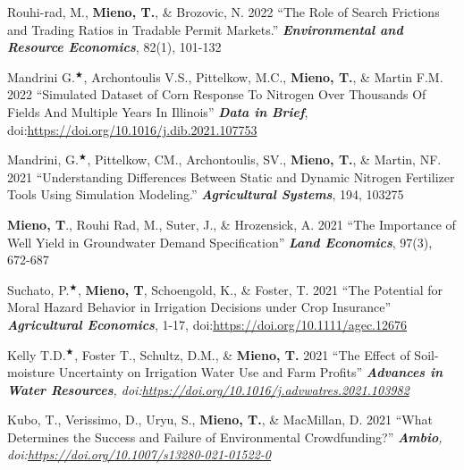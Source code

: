 \documentclass[10pt,margin,line]{res}
\newenvironment{list1}{
  \begin{list}{\ding{113}}{%
      \setlength{\itemsep}{0in}
      \setlength{\parsep}{0in} \setlength{\parskip}{0in}
      \setlength{\topsep}{0in} \setlength{\partopsep}{0in}
      \setlength{\leftmargin}{0.17in}}}{\end{list}}
\begin{document}
\begin{resume}
\begin{list1}
\item[] Rouhi-rad, M., \textbf{Mieno, T.}, \& Brozovic, N. 2022 ``The Role of Search Frictions and Trading Ratios in Tradable Permit Markets.'' \textit{\textbf{Environmental and Resource Economics}}, 82(1), 101-132
\vspace*{0.3cm}

\item[] Mandrini G.$^\bigstar$, Archontoulis V.S., Pittelkow, M.C., \textbf{Mieno, T.}, \& Martin F.M. 2022 ``Simulated Dataset of Corn Response To Nitrogen Over Thousands Of Fields And Multiple Years In Illinois'' \textit{\textbf{Data in Brief}}, doi:\url{https://doi.org/10.1016/j.dib.2021.107753}
\vspace*{0.3cm}

\item[] Mandrini, G.$^\bigstar$, Pittelkow, CM., Archontoulis, SV., \textbf{Mieno, T.},  \& Martin, NF. 2021 ``Understanding Differences Between Static and Dynamic Nitrogen Fertilizer Tools Using Simulation Modeling.'' \textit{\textbf{Agricultural Systems}}, 194, 103275
\vspace*{0.3cm}

\item[] \textbf{Mieno, T}., Rouhi Rad, M., Suter, J., \& Hrozensick, A. 2021 ``The Importance of Well Yield in Groundwater Demand Specification'' \textit{\textbf{Land Economics}}, 97(3), 672-687
\vspace*{0.3cm}

\item[] Suchato, P.$^\bigstar$, \textbf{Mieno, T}, Schoengold, K., \& Foster, T. 2021 ``The Potential for Moral Hazard Behavior in Irrigation Decisions under Crop Insurance'' \textit{\textbf{Agricultural Economics}}, 1-17, doi:\url{https://doi.org/10.1111/agec.12676}
\vspace*{0.3cm}

\item[] Kelly T.D.$^\bigstar$, Foster T., Schultz, D.M., \& \textbf{Mieno, T.} 2021 ``The Effect of Soil-moisture Uncertainty on Irrigation Water Use and Farm Profits'' \textit{\textbf{Advances in Water Resources}, doi:\url{https://doi.org/10.1016/j.advwatres.2021.103982}}
\vspace*{0.3cm}

\item[] Kubo, T., Verissimo, D., Uryu, S., \textbf{Mieno, T.}, \& MacMillan, D. 2021 ``What Determines the Success and Failure of Environmental Crowdfunding?'' \textit{\textbf{Ambio}, doi:\url{https://doi.org/10.1007/s13280-021-01522-0}}
\vspace*{0.3cm}


\end{list1}
\end{resume}
\end{document}
